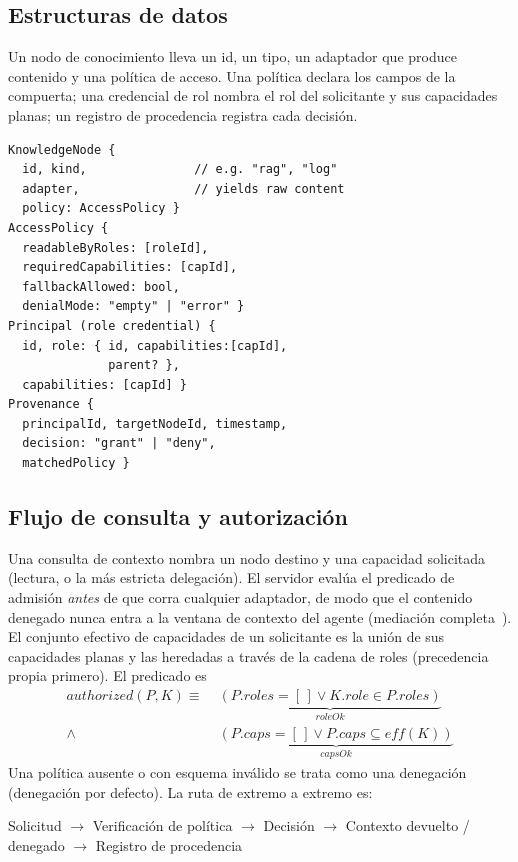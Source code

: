 \documentclass[conference,letterpaper]{IEEEtran}
\begin{document}
\subsection{Estructuras de datos}
Un nodo de conocimiento lleva un id, un tipo, un adaptador que produce contenido y una
pol\'itica de acceso. Una pol\'itica declara los campos de la compuerta; una
credencial de rol nombra el rol del solicitante y sus capacidades planas; un
registro de procedencia registra cada decisi\'on.

{\small
\begin{verbatim}
KnowledgeNode {
  id, kind,               // e.g. "rag", "log"
  adapter,                // yields raw content
  policy: AccessPolicy }
AccessPolicy {
  readableByRoles: [roleId],
  requiredCapabilities: [capId],
  fallbackAllowed: bool,
  denialMode: "empty" | "error" }
Principal (role credential) {
  id, role: { id, capabilities:[capId],
              parent? },
  capabilities: [capId] }
Provenance {
  principalId, targetNodeId, timestamp,
  decision: "grant" | "deny",
  matchedPolicy }
\end{verbatim}}

\subsection{Flujo de consulta y autorizaci\'on}
Una consulta de contexto nombra un nodo destino y una capacidad solicitada (lectura, o la m\'as
estricta delegaci\'on). El servidor eval\'ua el predicado de admisi\'on \emph{antes} de que corra
cualquier adaptador, de modo que el contenido denegado nunca entra a la ventana de contexto del
agente (mediaci\'on completa~\citep{saltzer1975}). El conjunto efectivo de capacidades de un
solicitante es la uni\'on de sus capacidades planas y las heredadas a trav\'es de la cadena de roles
(precedencia propia primero). El predicado es
\begin{align*}
\mathit{authorized}(P,K)\equiv\;
&\underbrace{(P.\textit{roles}{=}[\,]\vee K.\textit{role}{\in}P.\textit{roles})}_{\textit{roleOk}}\\
\wedge\;
&\underbrace{(P.\textit{caps}{=}[\,]\vee P.\textit{caps}{\subseteq}\mathit{eff}(K))}_{\textit{capsOk}}
\end{align*}
Una pol\'itica ausente o con esquema inv\'alido se trata como una denegaci\'on (denegaci\'on por
defecto). La ruta de extremo a extremo es:

\begin{center}\small
Solicitud $\rightarrow$ Verificaci\'on de pol\'itica $\rightarrow$ Decisi\'on
$\rightarrow$ Contexto devuelto / denegado $\rightarrow$ Registro de procedencia
\end{center}
\end{document}
